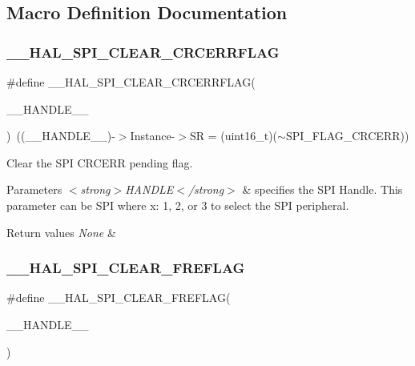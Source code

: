 \subsection{Macro Definition Documentation}
\mbox{\label{group___s_p_i___exported___macros_gad1cb4100b67726531ad426d300f4cd26}} 
\subsubsection{\texorpdfstring{\_\_HAL\_SPI\_CLEAR\_CRCERRFLAG}{\_\_HAL\_SPI\_CLEAR\_CRCERRFLAG}}
{\footnotesize\ttfamily \#define \+\_\+\+\_\+\+H\+A\+L\+\_\+\+S\+P\+I\+\_\+\+C\+L\+E\+A\+R\+\_\+\+C\+R\+C\+E\+R\+R\+F\+L\+AG(\begin{DoxyParamCaption}\item[{}]{\+\_\+\+\_\+\+H\+A\+N\+D\+L\+E\+\_\+\+\_\+ }\end{DoxyParamCaption})~((\+\_\+\+\_\+\+H\+A\+N\+D\+L\+E\+\_\+\+\_\+)-\/$>$Instance-\/$>$SR = (uint16\+\_\+t)($\sim$S\+P\+I\+\_\+\+F\+L\+A\+G\+\_\+\+C\+R\+C\+E\+RR))}



Clear the S\+PI C\+R\+C\+E\+RR pending flag. 


\begin{DoxyParams}{Parameters}
{\em $<$strong$>$\+H\+A\+N\+D\+L\+E$<$/strong$>$} & specifies the S\+PI Handle. This parameter can be S\+PI where x\+: 1, 2, or 3 to select the S\+PI peripheral. \\
\hline
\end{DoxyParams}

\begin{DoxyRetVals}{Return values}
{\em None} & \\
\hline
\end{DoxyRetVals}
\mbox{\label{group___s_p_i___exported___macros_ga7ff182f5cf6c731318c882351d6d7ac2}} 
\subsubsection{\texorpdfstring{\_\_HAL\_SPI\_CLEAR\_FREFLAG}{\_\_HAL\_SPI\_CLEAR\_FREFLAG}}
{\footnotesize\ttfamily \#define \+\_\+\+\_\+\+H\+A\+L\+\_\+\+S\+P\+I\+\_\+\+C\+L\+E\+A\+R\+\_\+\+F\+R\+E\+F\+L\+AG(\begin{DoxyParamCaption}\item[{}]{\+\_\+\+\_\+\+H\+A\+N\+D\+L\+E\+\_\+\+\_\+ }\end{DoxyParamCaption})}

